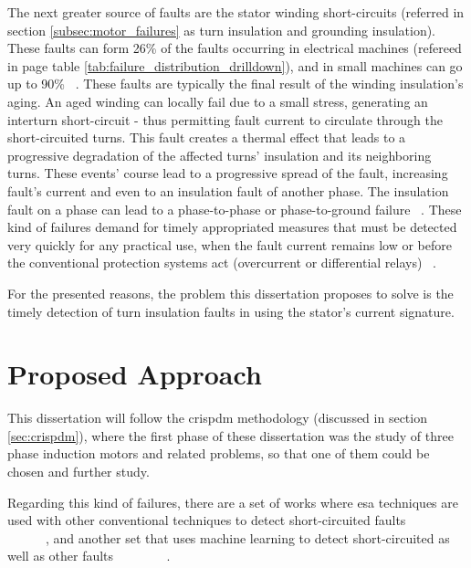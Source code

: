 The next greater source of faults are the stator winding short-circuits (referred in section \ref{subsec:motor_failures} as turn insulation and grounding insulation). These faults can form 26\% of the faults occurring in electrical machines (refereed in page \pageref{tab:failure_distribution_drilldown} table \ref{tab:failure_distribution_drilldown}), and in small machines can go up to 90\% ~\cite{Riera-Guasp2015}. These faults are typically the final result of the winding insulation's aging. An aged winding can locally fail due to a small stress, generating an interturn short-circuit - thus permitting fault current to circulate through the short-circuited turns. This fault creates a thermal effect that leads to a progressive degradation of the affected turns' insulation and its neighboring turns. These events' course lead to a progressive spread of the fault, increasing fault's current and even to an insulation fault of another phase. The insulation fault on a phase can lead to a phase-to-phase or phase-to-ground failure ~\cite{Riera-Guasp2015}. These kind of failures demand for timely appropriated measures that must be detected very quickly for any practical use, when the fault current remains low or before the conventional protection systems act (overcurrent or differential relays) ~\cite{Riera-Guasp2015}.

For the presented reasons, the problem this dissertation proposes to solve is the timely detection of turn insulation faults in  using the stator's current signature.





\section{Proposed Approach} %
\label{sec:proposed_approach}

This dissertation will follow the \acrlong{crispdm} methodology (discussed in section \ref{sec:crispdm}), where the first phase of these dissertation was the study of three phase induction motors and related problems, so that one of them could be chosen and further study. 

Regarding this kind of failures, there are a set of works where \Acrshort{esa} techniques are used with other conventional techniques to detect short-circuited faults ~\cite{Cheng2011} ~\cite{Joksimovic2013} ~\cite{Cruz2001} ~\cite{Cabanas2013} ~\cite{Gandhi2011} ~\cite{Kia2013} ~\cite{M.a2014} ~\cite{Bouzid2013} ~\cite{Bakhri2012}, and another set that uses machine learning to detect short-circuited as well as other faults  ~\cite{Ourici2012} ~\cite{Toma2011} ~\cite{Wolkiewicz2013} ~\cite{Patel2016} ~\cite{Jagadanand2015}.

